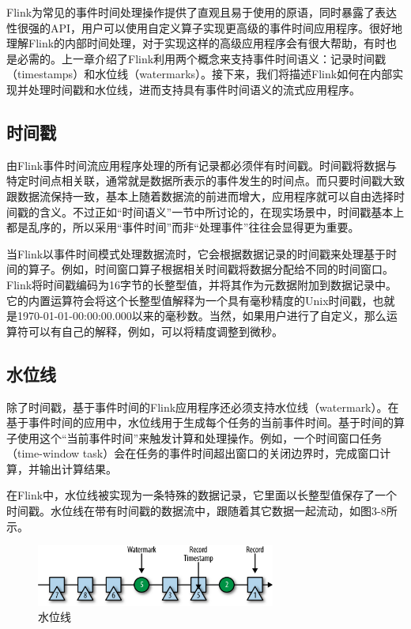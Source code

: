 \documentclass[cn,11pt,chinese]{elegantbook}
\begin{document}
Flink为常见的事件时间处理操作提供了直观且易于使用的原语，同时暴露了表达性很强的API，用户可以使用自定义算子实现更高级的事件时间应用程序。很好地理解Flink的内部时间处理，对于实现这样的高级应用程序会有很大帮助，有时也是必需的。上一章介绍了Flink利用两个概念来支持事件时间语义：记录时间戳（timestamps）和水位线（watermarks）。接下来，我们将描述Flink如何在内部实现并处理时间戳和水位线，进而支持具有事件时间语义的流式应用程序。

\subsection{时间戳}

由Flink事件时间流应用程序处理的所有记录都必须伴有时间戳。时间戳将数据与特定时间点相关联，通常就是数据所表示的事件发生的时间点。而只要时间戳大致跟数据流保持一致，基本上随着数据流的前进而增大，应用程序就可以自由选择时间戳的含义。不过正如“时间语义”一节中所讨论的，在现实场景中，时间戳基本上都是乱序的，所以采用“事件时间”而非“处理事件”往往会显得更为重要。

当Flink以事件时间模式处理数据流时，它会根据数据记录的时间戳来处理基于时间的算子。例如，时间窗口算子根据相关时间戳将数据分配给不同的时间窗口。Flink将时间戳编码为16字节的长整型值，并将其作为元数据附加到数据记录中。它的内置运算符会将这个长整型值解释为一个具有毫秒精度的Unix时间戳，也就是1970-01-01-00:00:00.000以来的毫秒数。当然，如果用户进行了自定义，那么运算符可以有自己的解释，例如，可以将精度调整到微秒。

\subsection{水位线}

除了时间戳，基于事件时间的Flink应用程序还必须支持水位线（watermark）。在基于事件时间的应用中，水位线用于生成每个任务的当前事件时间。基于时间的算子使用这个“当前事件时间”来触发计算和处理操作。例如，一个时间窗口任务（time-window task）会在任务的事件时间超出窗口的关闭边界时，完成窗口计算，并输出计算结果。

在Flink中，水位线被实现为一条特殊的数据记录，它里面以长整型值保存了一个时间戳。水位线在带有时间戳的数据流中，跟随着其它数据一起流动，如图3-8所示。

\begin{figure}[htbp]
    \centering
    \includegraphics[width=0.7\textwidth]{images/spaf_0308.png}
    \caption{水位线}
\end{figure}
\end{document}
